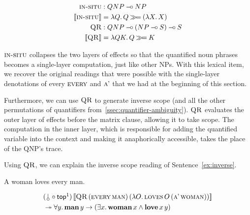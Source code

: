 \begin{align*}
  \textsc{in-situ} &: QNP \mathbin{{-}\mkern-3.5mu{\circ}} NP \\
  \llbracket \textsc{in-situ} \rrbracket &= \lambda Q.\, Q \mathbin{\gg\!=} (\lambda X.\, X) \\
  \textsc{QR} &: QNP \mathbin{{-}\mkern-3.5mu{\circ}} (NP \mathbin{{-}\mkern-3.5mu{\circ}} S) \mathbin{{-}\mkern-3.5mu{\circ}} S \\
  \llbracket \textsc{QR} \rrbracket &= \lambda Q K.\, Q \mathbin{\gg\!=} K
\end{align*}

$\textsc{in-situ}$ collapses the two layers of effects so that the
quantified noun phrases becomes a single-layer computation, just like
other NPs. With this lexical item, we recover the original readings that
were possible with the single-layer denotations of every $\textsc{every}$ and
$\textsc{a'}$ that we had at the beginning of this section.

Furthermore, we can use $\textsc{QR}$ to generate inverse scope (and all the
other permutations of quantifiers
from~\ref{ssec:quantifier-ambiguity}). $\textsc{QR}$ evaluates the outer layer
of effects before the matrix clause, allowing it to take scope. The
computation in the inner layer, which is responsible for adding the
quantified variable into the context and making it anaphorically
accessible, takes the place of the QNP's trace.

Using $\textsc{QR}$, we can explain the inverse scope reading of
Sentence~\ref{ex:inverse}.

\begin{exe}
  \ex A woman loves every man. \label{ex:inverse}
\end{exe}

\begin{align*}
  &\ap{(\cherry \circ \TOP\footnotemark)}{\sem{\app{\abs{QR}}{(\ap{\abs{every}}{\abs{man}})}{(\lam{O}{\app{\abs{loves}}{O}{(\ap{\abs{a'}}{\abs{woman}})}})}}} \\
  &\tto \forall y.\, \ap{\obj{man}}{y} \to (\exists x.\, \ap{\obj{woman}}{x} \land \app{\obj{love}}{x}{y})
\end{align*}


